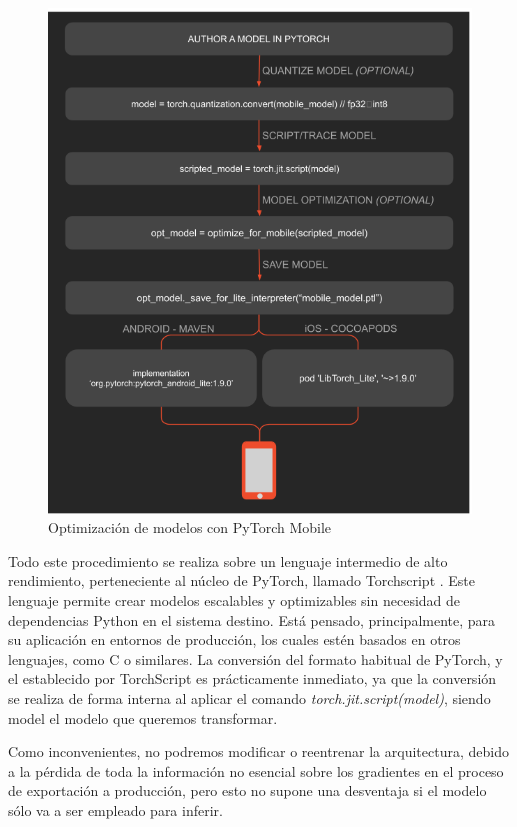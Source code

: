 \begin{figure}[H]
	\centering
	\includegraphics[scale = 0.5]{imagenes/pytorch-mobile.png}
	\caption{Optimización de modelos con PyTorch Mobile \cite{pmobile}}
	\label {fig:mobileprocess}
\end{figure}

Todo este procedimiento se realiza sobre un lenguaje intermedio de alto rendimiento, perteneciente al núcleo de PyTorch, llamado Torchscript \cite{torchscript}. Este lenguaje permite crear modelos escalables y optimizables sin necesidad de dependencias Python en el sistema destino. Está pensado, principalmente, para su aplicación en entornos de producción, los cuales estén basados en otros lenguajes, como C o similares. La conversión del formato habitual de PyTorch, y el establecido por TorchScript es prácticamente inmediato, ya que la conversión se realiza de forma interna al aplicar el comando \textit{torch.jit.script(model)}, siendo model el modelo que queremos transformar.

Como inconvenientes, no podremos modificar o reentrenar la arquitectura, debido a la pérdida de toda la información no esencial sobre los gradientes en el proceso de exportación a producción, pero esto no supone una desventaja si el modelo sólo va a ser empleado para inferir.

